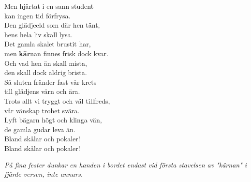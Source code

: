 \documentclass[a6paper, 10pt, twoside]{article}
\begin{document}
\begin{lyrics}
\newpage
\noindent
Men hjärtat i en sann student\\
kan ingen tid förfrysa.\\
Den glädjeeld som där hen tänt,\\
hens hela liv skall lysa.\\
Det gamla skalet brustit har,\\
men \textbf{kär}nan finnes frisk dock kvar.\\
Och vad hen än skall mista,\\
den skall dock aldrig brista.
\vspace{5pt}\\
Så sluten fränder fast vår krets\\
till glädjens värn och ära.\\
Trots allt vi tryggt och väl tillfreds,\\
vår vänskap trohet svära.\\
Lyft bägarn högt och klinga vän,\\
de gamla gudar leva än.\\
Bland skålar och pokaler!\\
Bland skålar och pokaler! 
\begin{center}
\textit{På fina fester dunkar en handen i bordet endast vid första stavelsen av "kärnan" i fjärde versen, inte annars.}
\end{center}
\end{lyrics}
\end{document}
